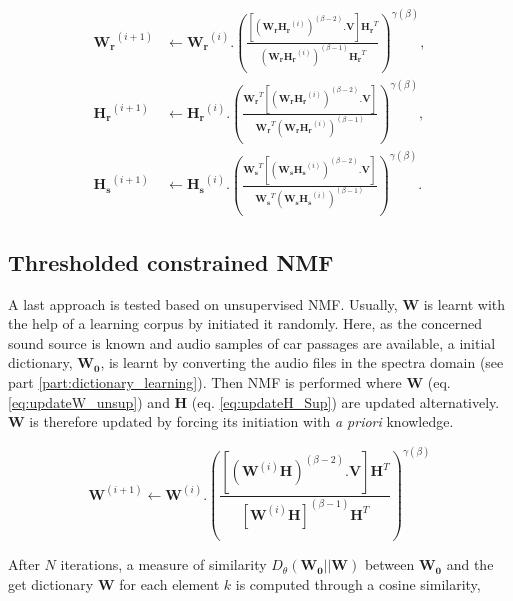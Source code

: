 \documentclass[twocolumn,a4paper,10pt]{article}
\begin{document}
{\scriptsize
\begin{subequations}\label{eq:WH-SSupdate}
\begin{align}
\mathbf{W_r}^{(i+1)} &\leftarrow \mathbf{W_r}^{(i)}.\left(\frac{\left[\left(\mathbf{W_r H_r}^{(i)} \right)^{(\beta-2)}.\mathbf{V} \right]\mathbf{H_r}^T}{\left(\mathbf{W_r H_r}^{(i)} \right)^{(\beta-1)}\mathbf{H_r}^T}\right)^{\gamma(\beta)}, \label{eq:W_r_SS}\\
\mathbf{H_r}^{(i+1)} &\leftarrow \mathbf{H_r}^{(i)}.\left(\frac{\mathbf{W_r}^T \left[\left(\mathbf{W_r H_r}^{(i)} \right)^{(\beta-2)}.\mathbf{V} \right]}{\mathbf{W_r}^T \left(\mathbf{W_r H_r}^{(i)} \right)^{(\beta-1)}}\right)^{\gamma(\beta)}, \label{eq:H_r_SS}\\
\mathbf{H_s}^{(i+1)} &\leftarrow \mathbf{H_s}^{(i)}.\left(\frac{\mathbf{W_s}^T \left[\left(\mathbf{W_s H_s}^{(i)} \right)^{(\beta-2)}.\mathbf{V} \right]}{\mathbf{W_s}^T \left(\mathbf{W_s H_s}^{(i)} \right)^{(\beta-1)}}\right)^{\gamma(\beta)}.\label{eq:H_s_SS}
\end{align}
\end{subequations}}

\subsection{Thresholded constrained NMF}

A last approach is tested based on unsupervised NMF. Usually, $\mathbf{W}$ is learnt with the help of a learning corpus by initiated it randomly. Here, as the concerned sound source is known and audio samples of car passages are available, a initial dictionary, $\mathbf{W_0}$, is learnt by converting the audio files in the spectra domain (see part \ref{part:dictionary_learning}). Then NMF is performed where $\mathbf{W}$ (eq. \ref{eq:updateW_unsup}) and $\mathbf{H}$ (eq.  \ref{eq:updateH_Sup}) are updated alternatively. $\mathbf{W}$ is therefore updated by forcing its initiation with \textit{a priori} knowledge.

\begin{equation}\label{eq:updateW_unsup}
\textbf{W}^{(i+1)} \leftarrow \mathbf{W}^{(i)}.\left(\frac{\left[\left(\mathbf{W}^{(i)}\mathbf{H} \right)^{(\beta-2)}.\mathbf{V} \right]\mathbf{H}^T}{\left[\mathbf{W}^{(i)}\mathbf{H} \right]^{(\beta-1)}\mathbf{H}^T}\right)^{\gamma(\beta)}
\end{equation}

After $N$ iterations, a measure of similarity $D_{\theta}\left(\mathbf{W_0} \vert \vert \mathbf{W} \right)$ between $\mathbf{W_0}$ and the get dictionary $\mathbf{W}$ for each element $k$ is computed through a cosine similarity, 
\end{document}
